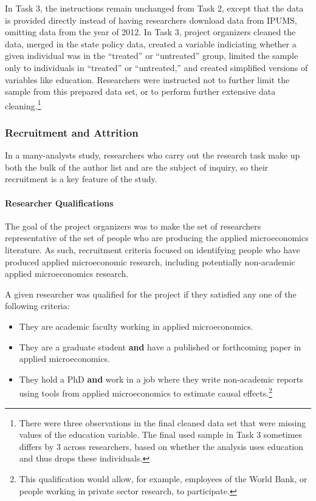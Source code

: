 \documentclass[
  letterpaper,
  DIV=11,
  numbers=noendperiod]{scrartcl}
\let\oldparagraph\paragraph
\renewcommand{\paragraph}[1]{\oldparagraph{#1}\mbox{}}
\begin{document}
In Task 3, the instructions remain unchanged from Task 2, except that
the data is provided directly instead of having researchers download
data from IPUMS, omitting data from the year of 2012. In Task 3, project
organizers cleaned the data, merged in the state policy data, created a
variable indiciating whether a given individual was in the ``treated''
or ``untreated'' group, limited the sample only to individuals in
``treated'' or ``untreated,'' and created simplified versions of
variables like education. Researchers were instructed not to further
limit the sample from this prepared data set, or to perform further
extensive data cleaning.\footnote{There were three observations in the
  final cleaned data set that were missing values of the education
  variable. The final used sample in Task 3 sometimes differs by 3
  across researchers, based on whether the analysis uses education and
  thus drops these individuals.}

\hypertarget{recruitment-and-attrition}{%
\subsubsection{Recruitment and
Attrition}\label{recruitment-and-attrition}}

In a many-analysts study, researchers who carry out the research task
make up both the bulk of the author list and are the subject of inquiry,
so their recruitment is a key feature of the study.

\hypertarget{researcher-qualifications}{%
\paragraph{Researcher Qualifications}\label{researcher-qualifications}}

The goal of the project organizers was to make the set of researchers
representative of the set of people who are producing the applied
microeconomics literature. As such, recruitment criteria focused on
identifying people who have produced applied microeconomic research,
including potentially non-academic applied microeconomics research.

A given researcher was qualified for the project if they satisfied any
one of the following criteria:

\begin{itemize}
\item
  They are academic faculty working in applied microeconomics.
\item
  They are a graduate student \textbf{and} have a published or
  forthcoming paper in applied microeconomics.
\item
  They hold a PhD \textbf{and} work in a job where they write
  non-academic reports using tools from applied microeconomics to
  estimate causal effects.\footnote{This qualification would allow, for
    example, employees of the World Bank, or people working in private
    sector research, to participate.}
\end{itemize}
\end{document}
